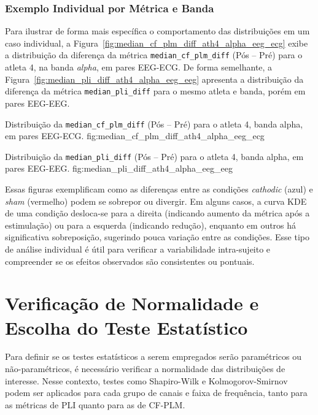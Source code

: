 \subsubsection{Exemplo Individual por Métrica e Banda}
Para ilustrar de forma mais específica o comportamento das distribuições em um caso individual, a Figura~\ref{fig:median_cf_plm_diff_ath4_alpha_eeg_ecg} exibe a distribuição da diferença da métrica \texttt{median\_cf\_plm\_diff} (Pós -- Pré) para o atleta 4, na banda \emph{alpha}, em pares EEG-ECG. De forma semelhante, a Figura~\ref{fig:median_pli_diff_ath4_alpha_eeg_eeg} apresenta a distribuição da diferença da métrica \texttt{median\_pli\_diff} para o mesmo atleta e banda, porém em pares EEG-EEG.

{Distribuição da \texttt{median\_cf\_plm\_diff} (Pós -- Pré) para o atleta 4, banda alpha, em pares EEG-ECG.}
{fig:median_cf_plm_diff_ath4_alpha_eeg_ecg}

{Distribuição da \texttt{median\_pli\_diff} (Pós -- Pré) para o atleta 4, banda alpha, em pares EEG-EEG.}
{fig:median_pli_diff_ath4_alpha_eeg_eeg}

Essas figuras exemplificam como as diferenças entre as condições \emph{cathodic} (azul) e \emph{sham} (vermelho) podem se sobrepor ou divergir. Em alguns casos, a curva KDE de uma condição desloca-se para a direita (indicando aumento da métrica após a estimulação) ou para a esquerda (indicando redução), enquanto em outros há significativa sobreposição, sugerindo pouca variação entre as condições. Esse tipo de análise individual é útil para verificar a variabilidade intra-sujeito e compreender se os efeitos observados são consistentes ou pontuais.

\section{Verificação de Normalidade e Escolha do Teste Estatístico}
Para definir se os testes estatísticos a serem empregados serão paramétricos ou não-paramétricos, é necessário verificar a normalidade das distribuições de interesse. Nesse contexto, testes como Shapiro-Wilk e Kolmogorov-Smirnov podem ser aplicados para cada grupo de canais e faixa de frequência, tanto para as métricas de PLI quanto para as de CF-PLM.

